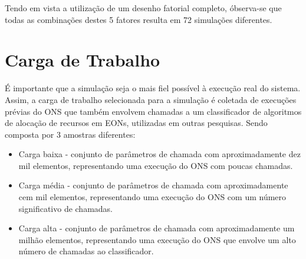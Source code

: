 Tendo em vista a utilização de um desenho fatorial completo, óbserva-se que todas as combinações destes 5 fatores resulta em 72 simulações diferentes.

\section{Carga de Trabalho}

É importante que a simulação seja o mais fiel possível à execução real do sistema. Assim, a carga de trabalho selecionada para a simulação é coletada de execuções prévias do ONS que também envolvem chamadas a um classificador de algoritmos de alocação de recursos em EONs, utilizadas em outras pesquisas. Sendo composta por 3 amostras diferentes:

\begin{itemize}
  \item Carga baixa - conjunto de parâmetros de chamada com aproximadamente dez mil elementos, representando uma execução do ONS com poucas chamadas.
  \item Carga média - conjunto de parâmetros de chamada com aproximadamente cem mil elementos, representando uma execução do ONS com um número significativo de chamadas.
  \item Carga alta - conjunto de parâmetros de chamada com aproximadamente um milhão elementos, representando uma execução do ONS que envolve um alto número de chamadas ao classificador.
\end{itemize}
